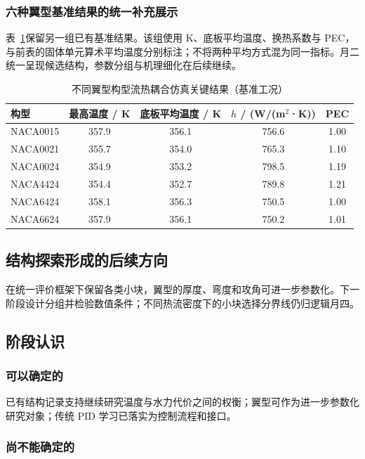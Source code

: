 \documentclass[stage2,fontset=fandol]{ydzjreport}
\begin{document}
\subsubsection{六种翼型基准结果的统一补充展示}
表~\ref{tab:airfoil-overview}保留另一组已有基准结果。该组使用 K、底板平均温度、换热系数与 PEC，与前表的固体单元算术平均温度分别标注；不将两种平均方式混为同一指标。月二统一呈现候选结构，参数分组与机理细化在后续继续。
\begin{table}[H]
\centering
\caption{不同翼型构型流热耦合仿真关键结果（基准工况）}
\label{tab:airfoil-overview}
\begin{tabularx}{\textwidth}{@{}l c c c c@{}}
\toprule
\rowcolor{ydzjlight} 构型 & 最高温度 / K & 底板平均温度 / K & $h$ / (W/(m$^2$·K)) & PEC \\
\midrule
NACA0015 & 357.9 & 356.1 & 756.6 & 1.00 \\
NACA0021 & 355.7 & 354.0 & 765.3 & 1.10 \\
NACA0024 & 354.9 & 353.2 & 798.5 & 1.19 \\
NACA4424 & 354.4 & 352.7 & 789.8 & 1.21 \\
NACA6424 & 358.1 & 356.3 & 750.5 & 1.00 \\
NACA6624 & 357.9 & 356.1 & 750.2 & 1.01 \\
\bottomrule
\end{tabularx}
\end{table}
\subsection{结构探索形成的后续方向}

在统一评价框架下保留各类小块，翼型的厚度、弯度和攻角可进一步参数化。下一阶段设计分组并检验数值条件；不同热流密度下的小块选择分界线仍归逻辑月四。

\subsection{阶段认识}

\subsubsection{可以确定的}

已有结构记录支持继续研究温度与水力代价之间的权衡；翼型可作为进一步参数化研究对象；传统 PID 学习已落实为控制流程和接口。

\subsubsection{尚不能确定的}
\end{document}
